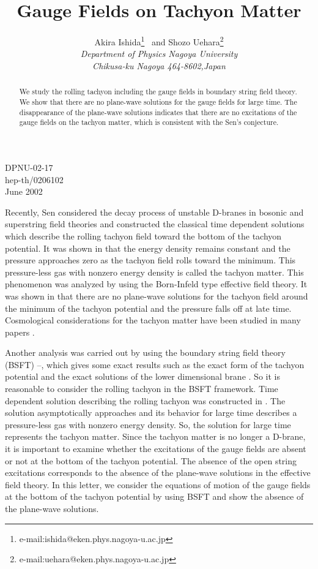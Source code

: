 \documentclass[12pt,a4paper]{article}
\title{Gauge Fields on Tachyon Matter}
\author{
{\sc Akira Ishida}\footnote{e-mail:ishida@eken.phys.nagoya-u.ac.jp}~
and
{\sc Shozo Uehara}\footnote{e-mail:uehara@eken.phys.nagoya-u.ac.jp}
\vspace{3mm}\\
{\sl Department of Physics Nagoya University}\\
{\sl Chikusa-ku Nagoya 464-8602,Japan}}
\date{}
\begin{document}
\maketitle
\vspace{-87mm}
\begin{flushright}
DPNU-02-17\\ hep-th/0206102\\ June 2002
\end{flushright}
\vspace{55mm}

\maketitle
\begin{abstract}
We study the rolling tachyon including the gauge fields
in boundary string field theory.
We show that there are no plane-wave solutions for the gauge fields
for large time.
The disappearance of the plane-wave solutions indicates
that there are no excitations of the gauge fields
on the tachyon matter, which is consistent with the Sen's conjecture.
\end{abstract}

Recently, Sen \cite{Sen1,Sen2} considered the decay process of
unstable D-branes in bosonic and superstring field theories and
constructed the classical time dependent solutions which describe the
rolling tachyon field toward the bottom of the tachyon potential.
It was shown in \cite{Sen2} that the energy density remains constant
and the pressure approaches zero as the tachyon field rolls toward the
minimum.
This pressure-less gas with nonzero energy density is called the
tachyon matter.
This phenomenon was analyzed by using the Born-Infeld type effective
field theory. It was shown in \cite{Sen3} that there are no plane-wave
solutions for the tachyon field around the minimum of the tachyon
potential and the pressure falls off at late time.
Cosmological considerations for the tachyon matter have been studied
in many papers \cite{cosmology}.

Another analysis was carried out by using the boundary string field
theory (BSFT) \cite{BSFT}--\cite{NP}, which gives some exact results
such as the exact form of the tachyon potential and the exact
solutions of the lower dimensional brane \cite{KMM1,KMM2}.
So it is reasonable to consider the rolling tachyon in the BSFT
framework. Time dependent solution describing the rolling tachyon
was constructed in \cite{ST,Mi}. The solution asymptotically
approaches \coordHE{} and its behavior for large time describes a
pressure-less gas with nonzero energy density. So, the solution for
large time represents the tachyon matter.
Since the tachyon matter is no longer a D-brane,
it is important to examine whether the excitations of the gauge fields
are absent or not at the bottom of the tachyon potential.
The absence of the open string excitations corresponds to
the absence of the plane-wave solutions in the effective field theory.
In this letter, we consider the equations of motion of the gauge
fields at the bottom of the tachyon potential by using BSFT
and show the absence of the plane-wave solutions.
\end{document}
